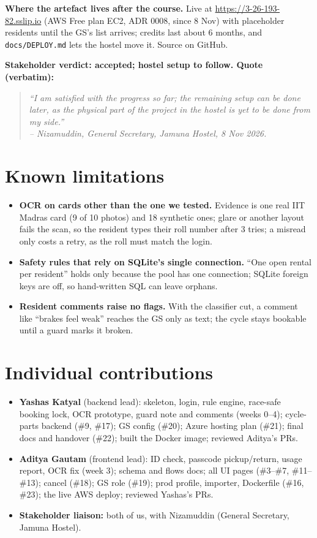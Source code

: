 \documentclass[11pt,a4paper]{article}
\begin{document}
\textbf{Where the artefact lives after the course.} Live at \url{https://3-26-193-82.sslip.io} (AWS Free plan EC2, ADR 0008, since 8 Nov) with placeholder residents until the GS's list arrives; credits last about 6 months, and \texttt{docs/DEPLOY.md} lets the hostel move it. Source on GitHub.

\textbf{Stakeholder verdict: accepted; hostel setup to follow. Quote (verbatim):}
\begin{quote}
\textit{``I am satisfied with the progress so far; the remaining setup can be done later, as the physical part of the project in the hostel is yet to be done from my side.''\\
-- Nizamuddin, General Secretary, Jamuna Hostel, 8 Nov 2026.}
\end{quote}

\section{Known limitations}

\begin{itemize}[leftmargin=*,nosep]
  \item \textbf{OCR on cards other than the one we tested.} Evidence is one real IIT Madras card (9 of 10 photos) and 18 synthetic ones; glare or another layout fails the scan, so the resident types their roll number after 3 tries; a misread only costs a retry, as the roll must match the login.
  \item \textbf{Safety rules that rely on SQLite's single connection.} ``One open rental per resident'' holds only because the pool has one connection; SQLite foreign keys are off, so hand-written SQL can leave orphans.
  \item \textbf{Resident comments raise no flags.} With the classifier cut, a comment like ``brakes feel weak'' reaches the GS only as text; the cycle stays bookable until a guard marks it broken.
\end{itemize}

\section{Individual contributions}

\begin{itemize}[leftmargin=*,nosep]
  \item \textbf{Yashas Katyal} (backend lead): skeleton, login, rule engine, race-safe booking lock, OCR prototype, guard note and comments (weeks 0--4); cycle-parts backend (\#9, \#17); GS config (\#20); Azure hosting plan (\#21); final docs and handover (\#22); built the Docker image; reviewed Aditya's PRs.
  \item \textbf{Aditya Gautam} (frontend lead): ID check, passcode pickup/return, usage report, OCR fix (week 3); schema and flows docs; all UI pages (\#3--\#7, \#11--\#13); cancel (\#18); GS role (\#19); prod profile, importer, Dockerfile (\#16, \#23); the live AWS deploy; reviewed Yashas's PRs.
  \item \textbf{Stakeholder liaison:} both of us, with Nizamuddin (General Secretary, Jamuna Hostel).
\end{itemize}
\end{document}
